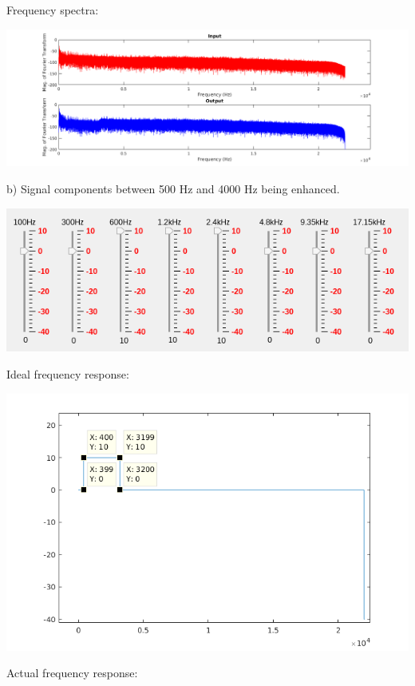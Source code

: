 \documentclass[titlepage]{article}
\begin{document}
Frequency spectra:

\begin{center}
\includegraphics[width=.9\linewidth]{fs_a.png}
\end{center}

b) Signal components between 500 Hz and 4000 Hz being enhanced.

\begin{center}
\includegraphics[width=.9\linewidth]{setting_b.png}
\end{center}

Ideal frequency response:

\begin{center}
\includegraphics[width=.9\linewidth]{ideal_fr_b.png}
\end{center}

Actual frequency response:
\end{document}
